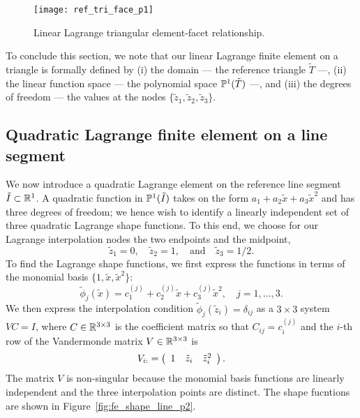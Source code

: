 \begin{figure}
  \centering
  \texttt{[image: ref\_tri\_face\_p1]}
  \caption{Linear Lagrange triangular element-facet relationship.}
  \label{fig:fe_ref_tri_face_p1}
\end{figure}

To conclude this section, we note that our linear Lagrange finite element on a triangle is formally defined by (i) the domain --- the reference triangle $\tilde T$ ---, (ii) the linear function space --- the polynomial space $\PP^1(\tilde T)$ ---, and (iii) the degrees of freedom --- the values at the nodes $\{\tilde z_1,\tilde z_2, \tilde z_3\}$.

\subsection{Quadratic Lagrange finite element on a line segment}
\label{sec:fe_p2_line}
We now introduce a quadratic Lagrange element on the reference line segment $\tilde I \subset \RR^1$. A quadratic function in $\PP^1(\tilde I)$ takes on the form $a_1 + a_2 \tilde x + a_3 \tilde x^2$ and has three degrees of freedom; we hence wish to identify a linearly independent set of three quadratic Lagrange shape functions. To this end, we choose for our Lagrange interpolation nodes the two endpoints and the midpoint,
\begin{equation*}
  \tilde z_1 = 0, \quad \tilde z_2 = 1, \quad \text{and} \quad \tilde z_3 = 1/2. 
\end{equation*}
To find the Lagrange shape functions, we first express the functions in terms of the monomial basis $\{ 1, \tilde x, \tilde x^2 \}$:
\begin{equation}
  \tilde \phi_j(\tilde x) = c_1^{(j)} + c_2^{(j)} \tilde x + c_3^{(j)} \tilde x^2, \quad j = 1,\dots, 3.
  \label{eq:fe_quad_line_rep}
\end{equation}
We then express the interpolation condition $\tilde \phi_j(\tilde z_i) = \delta_{ij}$ as a $3 \times 3$ system $VC = I$, where $C \in \RR^{3 \times 3}$ is the coefficient matrix so that $C_{ij} = c_i^{(j)}$ and the $i$-th row of the Vandermonde matrix $V \in \RR^{3 \times 3}$ is
\begin{equation*}
  V_{i:} = \bmat{ccc} 1 & \tilde z_i & \tilde z_i^2\emat.
\end{equation*}
The matrix $V$ is non-singular because the monomial basis functions are linearly independent and the three interpolation points are distinct. The shape fucntions are shown in Figure~\ref{fig:fe_shape_line_p2}. 
